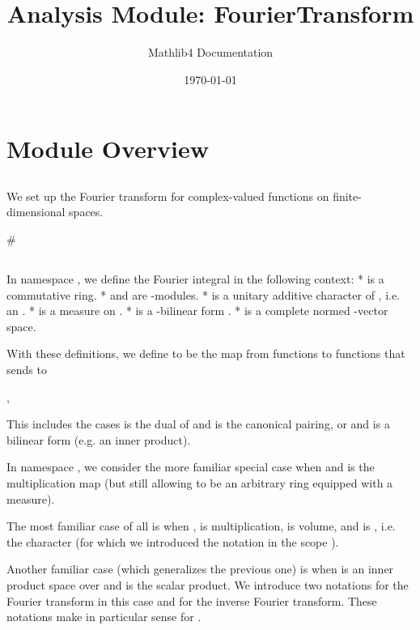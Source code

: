 \documentclass{article}
\title{Analysis Module: FourierTransform}
\author{Mathlib4 Documentation}
\date{\today}
\theoremstyle{definition}
\begin{document}
\maketitle

\section{Module Overview}
\subsection{\1}

We set up the Fourier transform for complex-valued functions on finite-dimensional spaces.

#\subsection{\1}

In namespace \texttt{\1}, we define the Fourier integral in the following context:
* \texttt{\1} is a commutative ring.
* \texttt{\1} and \texttt{\1} are \texttt{\1}-modules.
* \texttt{\1} is a unitary additive character of \texttt{\1}, i.e. an \texttt{\1}.
* \texttt{\1} is a measure on \texttt{\1}.
* \texttt{\1} is a \texttt{\1}-bilinear form \texttt{\1}.
* \texttt{\1} is a complete normed \texttt{\1}-vector space.

With these definitions, we define \texttt{\1} to be the map from functions \texttt{\1} to
functions \texttt{\1} that sends \texttt{\1} to

\texttt{\1},

This includes the cases \texttt{\1} is the dual of \texttt{\1} and \texttt{\1} is the canonical pairing, or \texttt{\1} and \texttt{\1}
is a bilinear form (e.g. an inner product).

In namespace \texttt{\1}, we consider the more familiar special case when \texttt{\1} and \texttt{\1} is the
multiplication map (but still allowing \texttt{\1} to be an arbitrary ring equipped with a measure).

The most familiar case of all is when \texttt{\1}, \texttt{\1} is multiplication, \texttt{\1} is volume, and
\texttt{\1} is \texttt{\1}, i.e. the character \texttt{\1} (for which we
introduced the notation \texttt{\1} in the scope \texttt{\1}).

Another familiar case (which generalizes the previous one) is when \texttt{\1} is an inner product space
over \texttt{\1} and \texttt{\1} is the scalar product. We introduce two notations \texttt{\1} for the Fourier transform in
this case and \texttt{\1} for the inverse Fourier transform. These notations make
in particular sense for \texttt{\1}.
\end{document}
